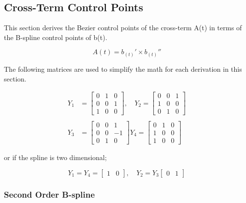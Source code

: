 \documentclass{article}
\begin{document}
\subsection{Cross-Term Control Points} \label{sec:Cross-Term Control Points}

This section derives the Bezier control points of the cross-term A(t) in terms of the B-spline control points of b(t). 

\begin{equation}
    A(t)  = b_{(t)}' \times b_{(t)}''
\end{equation}

The following matrices are used to simplify the math for each derivation in this section.

\begin{equation}
\begin{aligned}
    Y_1 &= \begin{bmatrix}
     0 & 1 & 0 \\ 0 & 0 & 1 \\ 1 & 0 & 0
    \end{bmatrix}, \quad  Y_2 = \begin{bmatrix}
     0 & 0 & 1 \\ 1 & 0 & 0 \\ 0 & 1 & 0
    \end{bmatrix} \\\\ Y_3 &= \begin{bmatrix}
     0 & 0 & 1 \\ 0 & 0 & -1 \\ 0 & 1 & 0
    \end{bmatrix}
      Y_4 = \begin{bmatrix}
     0 & 1 & 0 \\ 1 & 0 & 0 \\ 1 & 0 & 0
    \end{bmatrix}
\end{aligned}
\end{equation}

or if the spline is two dimensional;

\begin{equation}
    Y_1 = Y_4 = \begin{bmatrix} 1 & 0
    \end{bmatrix}, \quad  Y_2 = Y_3  \begin{bmatrix}0 & 1
    \end{bmatrix}
\end{equation}

\subsubsection{Second Order B-spline}
\end{document}
